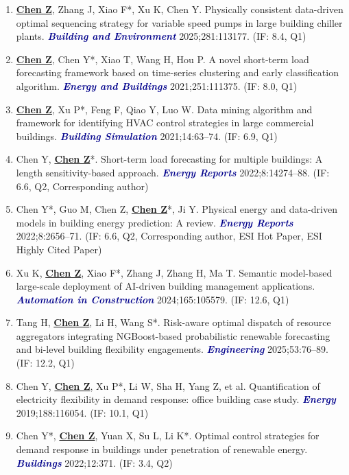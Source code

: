 \documentclass[11pt,a4paper]{article}
\newcommand{\me}[1]{\underline{\textbf{#1}}}
\newcommand{\journal}[1]{\textcolor{darkblue}{\textbf{\textit{#1}}}}
\begin{document}
\begin{enumerate}
\item \me{Chen Z}, Zhang J, Xiao F*, Xu K, Chen Y. Physically consistent data-driven optimal sequencing strategy for variable speed pumps in large building chiller plants. \journal{Building and Environment} 2025;281:113177. (IF: 8.4, Q1)

\item \me{Chen Z}, Chen Y*, Xiao T, Wang H, Hou P. A novel short-term load forecasting framework based on time-series clustering and early classification algorithm. \journal{Energy and Buildings} 2021;251:111375. (IF: 8.0, Q1)

\item \me{Chen Z}, Xu P*, Feng F, Qiao Y, Luo W. Data mining algorithm and framework for identifying HVAC control strategies in large commercial buildings. \journal{Building Simulation} 2021;14:63--74. (IF: 6.9, Q1)

\item Chen Y, \me{Chen Z}*. Short-term load forecasting for multiple buildings: A length sensitivity-based approach. \journal{Energy Reports} 2022;8:14274--88. (IF: 6.6, Q2, Corresponding author)

\item Chen Y*, Guo M, Chen Z, \me{Chen Z}*, Ji Y. Physical energy and data-driven models in building energy prediction: A review. \journal{Energy Reports} 2022;8:2656--71. (IF: 6.6, Q2, Corresponding author, ESI Hot Paper, ESI Highly Cited Paper)

\item Xu K, \me{Chen Z}, Xiao F*, Zhang J, Zhang H, Ma T. Semantic model-based large-scale deployment of AI-driven building management applications. \journal{Automation in Construction} 2024;165:105579. (IF: 12.6, Q1)

\item Tang H, \me{Chen Z}, Li H, Wang S*. Risk-aware optimal dispatch of resource aggregators integrating NGBoost-based probabilistic renewable forecasting and bi-level building flexibility engagements. \journal{Engineering} 2025;53:76--89. (IF: 12.2, Q1)

\item Chen Y, \me{Chen Z}, Xu P*, Li W, Sha H, Yang Z, et al. Quantification of electricity flexibility in demand response: office building case study. \journal{Energy} 2019;188:116054. (IF: 10.1, Q1)

\item Chen Y*, \me{Chen Z}, Yuan X, Su L, Li K*. Optimal control strategies for demand response in buildings under penetration of renewable energy. \journal{Buildings} 2022;12:371. (IF: 3.4, Q2)


\end{enumerate}
\end{document}
